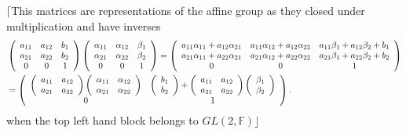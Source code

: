 \documentclass[aps,preprint]{revtex4}%
\begin{document}
$\lceil$This matrices are representations of the affine group as they closed
under multiplication and have inverses%
\begin{align}
&  \left(
\begin{array}
[c]{ccc}%
a_{11} & a_{12} & b_{1}\\
a_{21} & a_{22} & b_{2}\\
0 & 0 & 1
\end{array}
\right)  \left(
\begin{array}
[c]{ccc}%
\alpha_{11} & \alpha_{12} & \beta_{1}\\
\alpha_{21} & \alpha_{22} & \beta_{2}\\
0 & 0 & 1
\end{array}
\right)  =\left(
\begin{array}
[c]{ccc}%
a_{11}\alpha_{11}+a_{12}\alpha_{21} & a_{11}\alpha_{12}+a_{12}\alpha_{22} &
a_{11}\beta_{1}+a_{12}\beta_{2}+b_{1}\\
a_{21}\alpha_{11}+a_{22}\alpha_{21} & a_{21}\alpha_{12}+a_{22}\alpha_{22} &
a_{21}\beta_{1}+a_{22}\beta_{2}+b_{2}\\
0 & 0 & 1
\end{array}
\right) \\
&  =\left(
\begin{array}
[c]{cc}%
\left(
\begin{array}
[c]{cc}%
a_{11} & a_{12}\\
a_{21} & a_{22}%
\end{array}
\right)  \left(
\begin{array}
[c]{cc}%
\alpha_{11} & \alpha_{12}\\
\alpha_{21} & \alpha_{22}%
\end{array}
\right)  & \left(
\begin{array}
[c]{c}%
b_{1}\\
b_{2}%
\end{array}
\right)  +\left(
\begin{array}
[c]{cc}%
a_{11} & a_{12}\\
a_{21} & a_{22}%
\end{array}
\right)  \left(
\begin{array}
[c]{c}%
\beta_{1}\\
\beta_{2}%
\end{array}
\right) \\
0 & 1
\end{array}
\right)  .
\end{align}
when the top left hand block belongs to $GL\left(  2,\mathbb{F}\right)
\rfloor$
\end{document}
